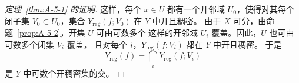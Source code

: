 \begin{proof}[定理~\ref{thm:A-5-1} 的证明]
这样，每个 $x\in U$ 都有一个开邻域 $U_0$，使得对其每个闭子集
$V_0\subset U_0$，集合 $Y_{\mathrm{reg}}(f;V_0)$ 在 $Y$ 中开且稠密。
由于 $X$ 可分，由命题~\ref{prop:A-5-2}，开集 $U$ 可由可数多个
这样的开邻域 $U_i$ 覆盖。因此，$U$ 也可由可数多个闭集 $V_i$ 覆盖，
且对每个 $i$，$Y_{\mathrm{reg}}(f;V_i)$ 都在 $Y$ 中开且稠密。
于是
\[
  Y_{\mathrm{reg}}(f)=\bigcap_i Y_{\mathrm{reg}}(f;V_i)
\]
是 $Y$ 中可数个开稠密集的交。
\end{proof}
